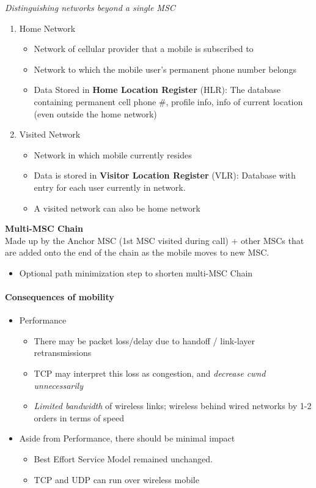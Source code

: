 \documentclass[a4paper]{article}
\begin{document}
\medskip
\noindent\textit{Distinguishing networks beyond a single MSC}
\begin{enumerate}
    \item Home Network
    \begin{itemize}[label=$\circ$]
        \item Network of cellular provider that a mobile is subscribed to
        \item Network to which the mobile user's permanent phone number belongs
        \item Data Stored in \textbf{Home Location Register} (HLR): The database containing permanent cell phone \#, profile info, info of current location (even outside the home network)
    \end{itemize}
    \item Visited Network
    \begin{itemize}[label=$\circ$]
        \item Network in which mobile currently resides
        \item Data is stored in \textbf{Visitor Location Register} (VLR): Database with entry for each user currently in network.
        \item A visited network can also be home network
    \end{itemize}
\end{enumerate}

\medskip
\noindent\textbf{Multi-MSC Chain}\\
Made up by the Anchor MSC (1st MSC visited during call) + other MSCs that are added onto the end of the chain as the mobile moves to new MSC.
\begin{itemize}
    \item Optional path minimization step to shorten multi-MSC Chain
\end{itemize}

\paragraph{Consequences of mobility}\mbox{}
\begin{itemize}
    \item Performance
    \begin{itemize}[label=$\circ$]
        \item There may be packet loss/delay due to handoff / link-layer retransmissions
        \item TCP may interpret this loss as congestion, and \textit{decrease cwnd unnecessarily}
        \item \textit{Limited bandwidth} of wireless links; wireless behind wired networks by 1-2 orders in terms of speed
    \end{itemize}
    \item Aside from Performance, there should be minimal impact
    \begin{itemize}[label=$\circ$]
        \item Best Effort Service Model remained unchanged.
        \item TCP and UDP can run over wireless mobile
    \end{itemize}
\end{itemize}
\end{document}
